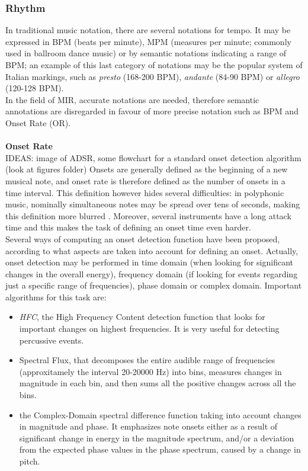 \subsubsection{Rhythm}
In traditional music notation, there are several notations for tempo. It may be expressed in BPM (beats per minute), MPM (measures per minute; commonly used in ballroom dance music) or by semantic notations indicating a range of BPM; an example of this last category of notations may be the popular system of Italian markings, such as \textit{presto} (168-200 BPM), \textit{andante} (84-90 BPM) or \textit{allegro} (120-128 BPM). \\ In the field of MIR, accurate notations are needed, therefore semantic annotations are disregarded in favour of more precise notation such as BPM and Onset Rate (OR).
\\ \\ 
\textbf{Onset Rate} \\ 
IDEAS: image of ADSR, some flowchart for a standard onset detection algorithm (look at figures folder)
Onsets are generally defined as the beginning of a new musical note, and onset rate is therefore defined as the number of onsets in a time interval. This definition however hides several difficulties: in polyphonic music, nominally simultaneous notes may be spread over tens of seconds, making this definition more blurred \cite{dixon06}. Moreover, several instruments have a long attack time and this makes the task of defining an onset time even harder. \\Several ways of computing an onset detection function have been proposed, according to what aspects are taken into account for defining an onset. Actually, onset detection may be performed in time domain (when looking for significant changes in the overall energy), frequency domain (if looking for events regarding just a specific range of frequencies), phase domain or complex domain. 
Important algorithms for this task are:
\begin{itemize}
\item \textit{HFC}, the High Frequency Content detection function that looks for important changes on highest frequencies. It is very useful for detecting percussive events.
\item Spectral Flux, that decomposes the entire audible range of frequencies (approxitamely the interval 20-20000 Hz) into bins, measures changes in magnitude in each bin, and then sums all the positive changes across all the bins.
\item the Complex-Domain spectral difference function \cite{bello04} taking into account changes in magnitude and phase. It emphasizes note onsets either as a result of significant change in energy in the magnitude spectrum, and/or a deviation from the expected phase values in the phase spectrum, caused by a change in pitch.
\end{itemize}  
